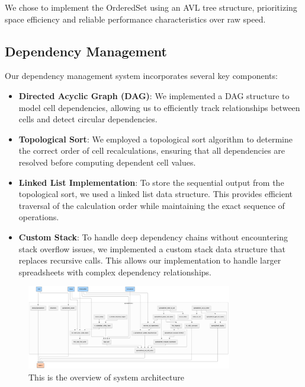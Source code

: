 \documentclass[10pt,a4paper]{article}  %
\begin{document}
We chose to implement the OrderedSet using an AVL tree structure, prioritizing space efficiency and reliable performance characteristics over raw speed.

\subsection{Dependency Management}
Our dependency management system incorporates several key components:

\begin{itemize}
    \item \textbf{Directed Acyclic Graph (DAG)}: We implemented a DAG structure to model cell dependencies, allowing us to efficiently track relationships between cells and detect circular dependencies.
    
    \item \textbf{Topological Sort}: We employed a topological sort algorithm to determine the correct order of cell recalculations, ensuring that all dependencies are resolved before computing dependent cell values.
    
    \item \textbf{Linked List Implementation}: To store the sequential output from the topological sort, we used a linked list data structure. This provides efficient traversal of the calculation order while maintaining the exact sequence of operations.
    
    \item \textbf{Custom Stack}: To handle deep dependency chains without encountering stack overflow issues, we implemented a custom stack data structure that replaces recursive calls. This allows our implementation to handle larger spreadsheets with complex dependency relationships.
\end{itemize}

\begin{figure}[h!]
    \centering
    \includegraphics[width=0.8\textwidth]{flowchart.png}
    \caption{This is the overview of system architecture}
    \label{fig:system_architecture}
\end{figure}
\end{document}
